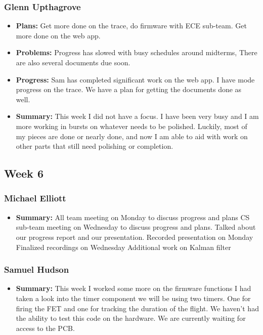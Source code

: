 \documentclass[onecolumn, draftclsnofoot,10pt, compsoc]{IEEEtran}
\begin{document}
\subsubsection{Glenn Upthagrove}
\begin {itemize}
 \item \textbf{Plans: }Get more done on the trace, do firmware with ECE sub-team. Get more done on the web app.
 \item \textbf{Problems: }Progress has slowed with busy schedules around midterms, There are also several documents due soon. 
 \item \textbf{Progress: }Sam has completed significant work on the web app. I have mode progress on the trace. We have a plan for getting the documents done as well. 
 \item \textbf{Summary: }This week I did not have a focus. I have been very busy and I am more working in bursts on whatever needs to be polished. Luckily, most of my pieces are done or nearly done, and now I am able to aid with work on other parts that still need polishing or completion. 
\end {itemize}
\subsection{Week 6}
\subsubsection{Michael Elliott}
\begin{itemize}
 \item \textbf{Summary: }All team meeting on Monday to discuss progress and plans
CS sub-team meeting on Wednesday to discuss progress and plans. Talked
about our progress report and our presentation.
Recorded presentation on Monday
Finalized recordings on Wednesday
Additional work on Kalman filter
\end{itemize}
\subsubsection{Samuel Hudson}
\begin{itemize}
 \item \textbf{Summary: }This week I worked some more on the firmware functions I had taken a look into the timer component we will be using two timers. One for firing the FET and one for tracking the duration of the flight. We haven't had the ability to test this code on the hardware. We are currently waiting for access to the PCB.
\end{itemize}
\end{document}
